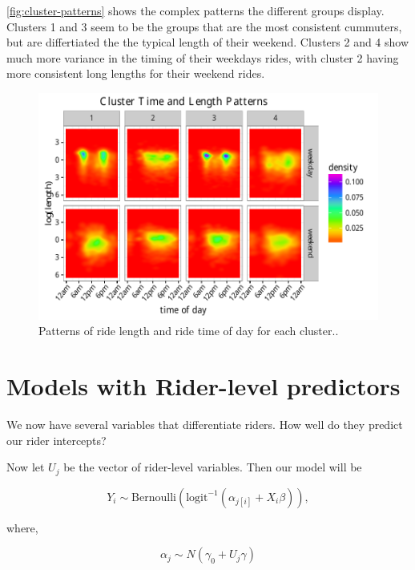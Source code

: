 \documentclass[12pt,twoside]{reedthesis}
\begin{document}
  \autoref{fig:cluster-patterns} shows the complex patterns the different
  groups display. Clusters 1 and 3 seem to be the groups that are the most
  consistent cummuters, but are differtiated the the typical length of
  their weekend. Clusters 2 and 4 show much more variance in the timing of
  their weekdays rides, with cluster 2 having more consistent long lengths
  for their weekend rides.
  
  \begin{figure}[bht]
  \centering
  \includegraphics[angle = 0,scale = 1]{figure/cluster_patterns.pdf}
  \caption[Patterns of ride length and ride time of day for each cluster..]{\normalsize{Patterns of ride length and ride time of day for each cluster..}}
  \label{fig:cluster-patterns}
  \end{figure}
  
  \section{Models with Rider-level
  predictors}\label{models-with-rider-level-predictors}
  
  We now have several variables that differentiate riders. How well do
  they predict our rider intercepts?
  
  Now let \(U_j\) be the vector of rider-level variables. Then our model
  will be
  
  \begin{equation}
  Y_i \sim \text{Bernoulli} \left( \text{logit}^{-1}
  (\alpha_{j[i]} + X_i \beta) \right),
  \end{equation}
  
  where,
  
  \begin{equation}
  \alpha_j \sim N(\gamma_0 + U_j \gamma)
  \end{equation}
  
\end{document}
